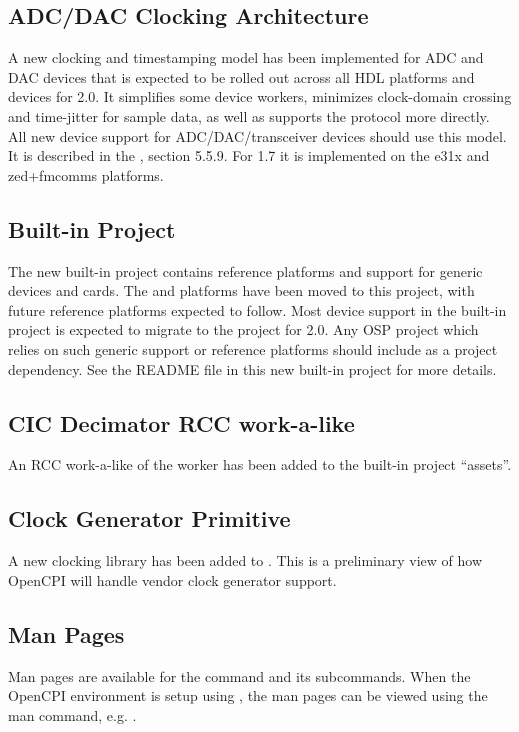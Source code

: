 \subsection{ADC/DAC Clocking Architecture}
\label{sec:17_adc_dac}
A new clocking and timestamping model has been implemented for ADC and DAC devices that is expected to be rolled out across all HDL platforms and devices for 2.0.  It simplifies some device workers, minimizes clock-domain crossing and time-jitter for sample data, as well as supports the  protocol more directly. All new device support for ADC/DAC/transceiver devices should use this model.  It is described in the , section 5.5.9.  For 1.7 it is implemented on the e31x and zed+fmcomms platforms.

\subsection{Built-in  Project}
\label{sec:17_platform_project}
The new built-in  project contains reference platforms and support for generic devices and cards. The  and  platforms have been moved to this project, with future reference platforms expected to follow. Most device support in the built-in  project is expected to migrate to the  project for 2.0. Any OSP project which relies on such generic support or reference platforms should include  as a project dependency. See the README file in this new built-in project for more details.

\subsection{CIC Decimator RCC work-a-like}
\label{sec17_cic_dec}
An RCC work-a-like of the  worker has been added to the built-in project ``assets''.

\subsection{Clock Generator Primitive}
\label{sec:17_clocking}
A new clocking library has been added to . This is a preliminary view of how OpenCPI will handle vendor clock generator support.

\subsection{Man Pages}
\label{sec:17_man_pages}
Man pages are available for the  command and its subcommands. When the OpenCPI environment is setup using , the man pages can be viewed using the man command, e.g. .

